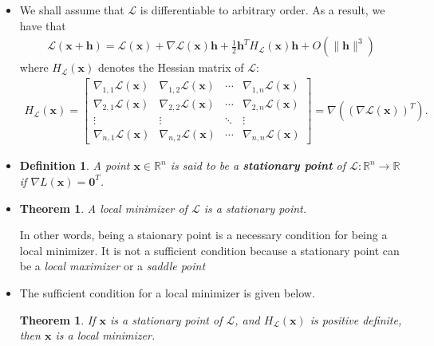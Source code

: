 \documentclass[10pt]{article}
\newtheorem{theorem}[lemma]{Theorem}
\newtheorem{definition}[lemma]{Definition}
\newcommand{\ve}[1]{\mathbf{#1}}
\newcommand{\ra}{\rightarrow}
\newcommand{\mcal}[1]{\mathcal{#1}}
\newcommand{\Real}{\mathbb{R}}
\begin{document}
\begin{itemize}
    \item We shall assume that $\mcal{L}$ is differentiable to arbitrary order. As a result, we have that
    \begin{align*}
        \mcal{L}(\ve{x} + \ve{h}) = \mcal{L}(\ve{x}) + \nabla\mcal{L}(\ve{x}) \ve{h} + \frac{1}{2} \ve{h}^T H_{\mcal{L}}(\ve{x}) \ve{h} + O(\| \ve{h} \|^3)
    \end{align*}
    where $H_{\mcal{L}}(\ve{x})$ denotes the Hessian matrix of $\mcal{L}$:
    \begin{align*}
        H_{\mcal{L}}(\ve{x}) = \begin{bmatrix}
            \nabla_{1,1} \mcal{L}(\ve{x}) & \nabla_{1,2} \mcal{L}(\ve{x}) & \cdots & \nabla_{1,n} \mcal{L}(\ve{x}) \\
            \nabla_{2,1} \mcal{L}(\ve{x}) & \nabla_{2,2} \mcal{L}(\ve{x}) & \cdots & \nabla_{2,n} \mcal{L}(\ve{x}) \\
            \vdots & \vdots & \ddots & \vdots \\
            \nabla_{n,1} \mcal{L}(\ve{x}) & \nabla_{n,2} \mcal{L}(\ve{x}) & \cdots & \nabla_{n,n} \mcal{L}(\ve{x})           
        \end{bmatrix}
        = \nabla((\nabla \mcal{L}(\ve{x}))^T).
    \end{align*}

    \item \begin{definition}
        A point $\ve{x} \in \Real^n$ is said to be a {\bf stationary point} of $\mcal{L}: \Real^n \ra \Real$ if $\nabla{L}(\ve{x}) = \ve{0}^T$.
    \end{definition}

    \item \begin{theorem}
        A local minimizer of $\mcal{L}$ is a stationary point.
    \end{theorem}
    In other words, being a staionary point is a necessary condition for being a local minimizer. It is not a sufficient condition because a stationary point can be a \emph{local maximizer} or a \emph{saddle point}      

    \item The sufficient condition for a local minimizer is given below.
    \begin{theorem}
        If $\ve{x}$ is a stationary point of $\mcal{L}$, and $H_{\mcal{L}}(\ve{x})$ is positive definite, then $\ve{x}$ is a local minimizer.
    \end{theorem}
\end{itemize}
\end{document}
